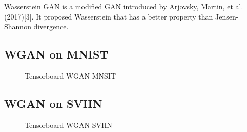 \documentclass{article}
\begin{document}
Wasserstein GAN is a modified GAN introduced by Arjovsky, Martin, et al.(2017)[3]. 
It proposed Wasserstein that has a better property than Jensen-Shannon divergence.

\subsection{WGAN on MNIST}

\begin{figure}[!htb]
  \centering
  \caption{Tensorboard WGAN MNSIT}
  \label{fig:TB_GAN_MNSIT}
\end{figure}

\subsection{WGAN on SVHN}

\begin{figure}[!htb]
  \centering
  \caption{Tensorboard WGAN SVHN}
  \label{fig:TB_WGAN_SVHN}
\end{figure}
\end{document}
